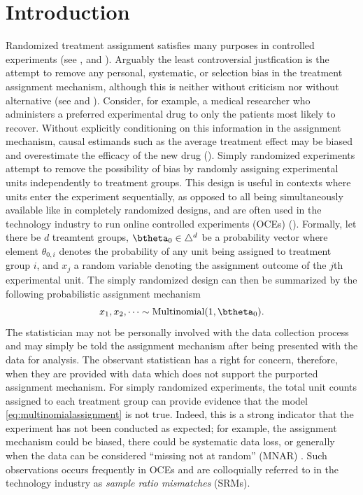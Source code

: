 \documentclass[11pt]{article}
\begin{document}
\section{Introduction}
\label{sec:intro}
Randomized treatment assignment satisfies many purposes in controlled experiments (see \cite{kempthorne}, \cite{cox} and \cite{rubin}).
Arguably the least controversial justfication is the attempt to remove any personal, systematic, or selection bias in the treatment assignment mechanism, although this is neither without criticism nor without alternative (see \cite{lindley} and \cite{kadane}).
Consider, for example, a medical researcher who administers a preferred experimental drug to only the patients most likely to recover.
Without explicitly conditioning on this information in the assignment mechanism, causal estimands such as the average treatment effect may be biased and overestimate the efficacy of the new drug (\cite{berry}).
Simply randomized experiments attempt to remove the possibility of bias by randomly assigning experimental units independently to treatment groups.
This design is useful in contexts where units enter the experiment sequentially, as opposed to all being simultaneously available like in completely randomized designs, and are often used in the technology industry to run online controlled experiments (OCEs) (\cite{oce}).
Formally, let there be $d$ treamtent groups, $\btheta_0 \in \triangle^d$ be a probability vector where element $\theta_{0,i}$ denotes the probability of any unit being assigned to treatment group $i$, and $x_j$ a random variable denoting the assignment outcome of the $j$th experimental unit.
The simply randomized design can then be summarized by the following probabilistic assignment mechanism
\begin{equation}
  \label{eq:multinomialassignment}
  x_1,x_2, \dots \sim \text{Multinomial}(1,\btheta_0).
\end{equation}
The statistician may not be personally involved with the data collection process and may simply be told the assignment mechanism after being presented with the data for analysis.
The observant statistican has a right for concern, therefore, when they are provided with data which does not support the purported assignment mechanism.
For simply randomized experiments, the total unit counts assigned to each treatment group can provide evidence that the model \eqref{eq:multinomialassignment} is not true.
Indeed, this is a strong indicator that the experiment has not been conducted as expected; for example, the assignment mechanism could be biased, there could be systematic data loss, or generally when the data can be considered ``missing not at random'' (MNAR) \citep{missing-data}.
Such observations occurs frequently in OCEs and are colloquially referred to in the technology industry as \textit{sample ratio mismatches} (SRMs).
\end{document}
